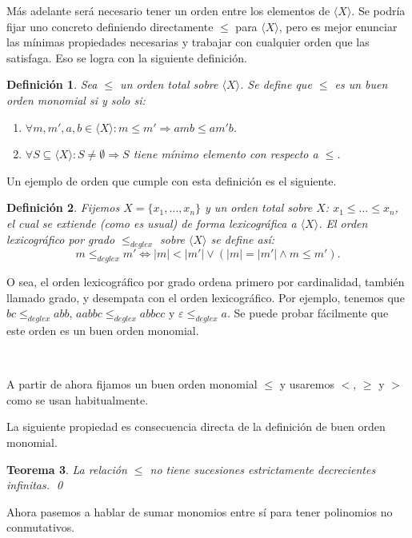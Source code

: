 \documentclass[12pt]{report}
\theoremstyle{customstyle}
\newtheorem{theorem}{Teorema}[chapter]
\newtheorem{definition}[theorem]{Definición}
\theoremstyle{factstyle}
\begin{document}
Más adelante será necesario tener un orden entre los elementos de $⟨X⟩$. Se podría fijar uno concreto definiendo directamente $≤$ para $⟨X⟩$, pero es mejor enunciar las mínimas propiedades necesarias y trabajar con cualquier orden que las satisfaga. Eso se logra con la siguiente definición.

\begin{definition}\label{def:buen orden monomial}
  Sea $≤$ un orden total sobre $⟨X⟩$. Se define que $≤$ es un buen orden monomial si y solo si:
  \begin{enumerate}
    \item $∀m, m', a, b ∈ ⟨X⟩ : m ≤ m' ⇒ a m b ≤ a m' b$.
    \item $∀S ⊆ ⟨X⟩ : S ≠ ∅ ⇒ S$ tiene mínimo elemento con respecto a $≤$.
  \end{enumerate}
\end{definition}

Un ejemplo de orden que cumple con esta definición es el siguiente.

\begin{definition}\label{def:orden lexicográfico por grado}
  Fijemos $X = \{x_1, …, x_n\}$ y un orden total sobre $X$: $x_1 ≤ … ≤ x_n$, el cual se extiende (como es usual) de forma lexicográfica a $⟨X⟩$. El orden lexicográfico por grado $ ≤_{deglex}$ sobre $⟨X⟩$ se define así:
  \[ m ≤_{deglex} m' ⇔ |m| < |m'| ∨ (|m| = |m'| ∧ m ≤ m') \text{.}\]
\end{definition}

O sea, el orden lexicográfico por grado ordena primero por cardinalidad, también llamado grado, y desempata con el orden lexicográfico. Por ejemplo, tenemos que $bc ≤_{deglex} abb$, $aabbc ≤_{deglex} abbcc$ y $ε ≤_{deglex} a$. Se puede probar fácilmente que este orden es un buen orden monomial.

\

A partir de ahora fijamos un buen orden monomial $≤$ y usaremos $<$, $≥$ y $>$ como se usan habitualmente.

La siguiente propiedad es consecuencia directa de la definición de buen orden monomial.

\begin{theorem}\label{thm:≤ no sucesiones dec inf}
  La relación $≤$ no tiene sucesiones estrictamente decrecientes infinitas.
  \qed
\end{theorem}

Ahora pasemos a hablar de sumar monomios entre sí para tener polinomios no conmutativos.
\end{document}
